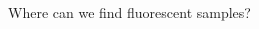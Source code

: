 \documentclass[presentation]{beamer}
\begin{document}
\begin{frame}{Where can we find fluorescent samples?}
\begin{columns}
\begin{column}{.33\textwidth}
    \end{column}
    \begin{column}{.33\textwidth}
      \centering
      \\ \vspace{0.2em}
      \\
    \end{column}
    \begin{column}{.33\textwidth}
      \centering
      \\ \vspace{0.2em}

\end{column}
\end{columns}
\end{frame}
\end{document}
